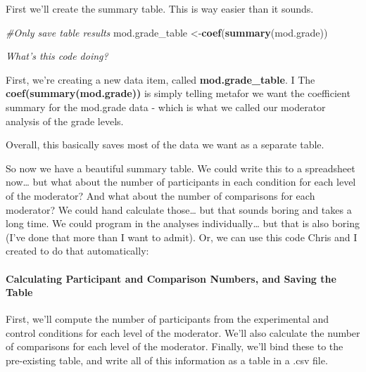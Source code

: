 \documentclass[
]{book}
\newenvironment{Shaded}{\begin{snugshade}}{\end{snugshade}}
\newcommand{\CommentTok}[1]{\textcolor[rgb]{0.56,0.35,0.01}{\textit{#1}}}
\newcommand{\FunctionTok}[1]{\textcolor[rgb]{0.13,0.29,0.53}{\textbf{#1}}}
\newcommand{\NormalTok}[1]{#1}
\newcommand{\OtherTok}[1]{\textcolor[rgb]{0.56,0.35,0.01}{#1}}
\begin{document}
First we'll create the summary table. This is way easier than it sounds.

\begin{Shaded}
\begin{Highlighting}[]
\CommentTok{\#Only save table results }
\NormalTok{mod.grade\_table }\OtherTok{\textless{}{-}}\FunctionTok{coef}\NormalTok{(}\FunctionTok{summary}\NormalTok{(mod.grade))}
\end{Highlighting}
\end{Shaded}

\emph{What's this code doing?}

First, we're creating a new data item, called \textbf{mod.grade\_table}. I The \textbf{coef(summary(mod.grade))} is simply telling metafor we want the coefficient summary for the mod.grade data - which is what we called our moderator analysis of the grade levels.

Overall, this basically saves most of the data we want as a separate table.

So now we have a beautiful summary table. We could write this to a spreadsheet now\ldots{} but what about the number of participants in each condition for each level of the moderator? And what about the number of comparisons for each moderator? We could hand calculate those\ldots{} but that sounds boring and takes a long time. We could program in the analyses individually\ldots{} but that is also boring (I've done that more than I want to admit). Or, we can use this code Chris and I created to do that automatically:

\hypertarget{calculating-participant-and-comparison-numbers-and-saving-the-table}{%
\paragraph{Calculating Participant and Comparison Numbers, and Saving the Table}\label{calculating-participant-and-comparison-numbers-and-saving-the-table}}

First, we'll compute the number of participants from the experimental and control conditions for each level of the moderator. We'll also calculate the number of comparisons for each level of the moderator. Finally, we'll bind these to the pre-existing table, and write all of this information as a table in a .csv file.
\end{document}

